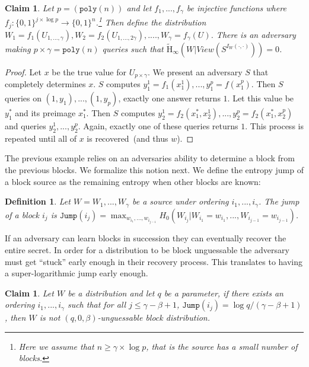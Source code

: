 \documentclass[11pt]{article}
\newcommand{\zo}{\ensuremath{\{0, 1\}}}
\newcommand{\poly}{\ensuremath{\mathtt{poly}}\xspace}
\newcommand{\Hav}{\tilde{\mathrm{H}}_\infty}
\newtheorem{definition}[theorem]{Definition}
\newtheorem{claim}[theorem]{Claim}
\begin{document}
\begin{claim}
Let $p = (\poly(n))$ and let $f_1,..., f_{\gamma}$ be injective functions where $f_j:\zo^{j\times \log p}\rightarrow \zo^n$.\footnote{Here we assume that $n\ge \gamma \times \log p$, that is the source has a small number of blocks.}  Then define the distribution $W_1 = f_1(U_{1,...,\gamma}), W_2 = f_2(U_{1,..., 2\gamma}),...., W_\gamma = f_\gamma(U)$.  There is an adversary making $p\times \gamma = \poly(n)$ queries such that $\Hav(W | View(S^{I_W(\cdot, \cdot)})) = 0$.
\end{claim}
\begin{proof}
Let $x$ be the true value for $U_{p\times \gamma}$.
We present an adversary $S$ that completely determines $x$.  $S$ computes $y_1^1 = f_1(x_1^1),..., y_1^p = f(x_1^p)$.  Then $S$ queries on $(1, y_1),..., (1, y_p)$, exactly one answer returns $1$.  Let this value be $y_1^*$ and its preimage $x_1^*$.  Then $S$ computes $y_2^1 = f_2(x_1^*,x_2^1), ..., y_2^p= f_2(x_1^*, x_2^p)$ and queries $y_2^1,..., y_2^p$.  Again, exactly one of these queries returns $1$.  This process is repeated until all of $x$ is recovered~(and thus $w$).  %
\end{proof}

The previous example relies on an adversaries ability to determine a block from the previous blocks.  We formalize this notion next.  We define the entropy jump of a block source as the remaining entropy when other blocks are known:

\begin{definition}
Let $W = W_1,..., W_\gamma$ be a source under ordering $i_1,..., i_\gamma$.  The \emph{jump} of a block $i_j$ is $\mathtt{Jump}(i_j) = \max_{w_{i_1},..., w_{i_{j-1}}} H_0 (W_{i_j} | W_{i_1} = w_{i_1} ,..., W_{i_{j-1}} = w_{i_{j-1}})$.
\end{definition}

If an adversary can learn blocks in succession they can eventually recover the entire secret.  In order for a distribution to be block unguessable the adversary must get ``stuck'' early enough in their recovery process.  This translates to having a super-logarithmic jump early enough.

\begin{claim}
Let $W$ be a distribution and let $q$ be a parameter, if there exists an ordering $i_1,..., i_\gamma$ such that for all $j\le \gamma-\beta +1$, $\mathtt{Jump}(i_j) = \log q /(\gamma-\beta+1)$, then $W$ is not $(q, 0, \beta)$-unguessable block distribution.
\end{claim}
\end{document}
